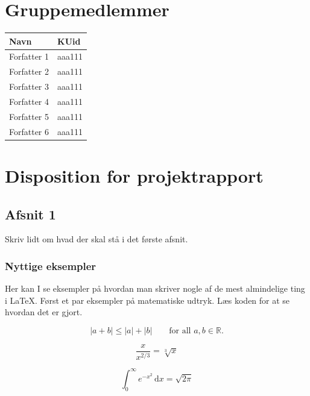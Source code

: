 \documentclass[10pt,reqno, usenames]{article}
\begin{document}
\maketitle

\newpage

\section*{Gruppemedlemmer}
\begin{center}
\begin{tabular}{ p{5cm} |p{1.5cm} }
 \centering Navn &   KUid \\ \hline
 Forfatter 1 & aaa111  \\ \hline 
 Forfatter 2 & aaa111  \\ \hline 
 Forfatter 3 & aaa111  \\ \hline 
 Forfatter 4 & aaa111  \\ \hline 
 Forfatter 5 & aaa111  \\ \hline 
 Forfatter 6 & aaa111  \\ \hline 
\end{tabular}
\end{center}

\newpage

\section{Disposition for projektrapport}
\subsection{Afsnit 1}
Skriv lidt om hvad der skal stå i det første afsnit. 
\subsubsection{Nyttige eksempler}
Her kan I se eksempler på hvordan man skriver nogle af de mest almindelige ting i \LaTeX. Først et par eksempler på matematiske udtryk. Læs koden for at se hvordan det er gjort.

\begin{equation}\label{trekantsulighed}
    |a+b| \leq |a| + |b| \qquad \text{for all } a,b \in \mathbb{R}.
\end{equation}

\begin{equation}
    \frac{x}{x^{2/3}}=\sqrt[3]{x}
\end{equation}

\begin{equation}
    \int_0^\infty e^{-x^2}\, \text{d}x=\sqrt{2\pi}
\end{equation}
\end{document}
